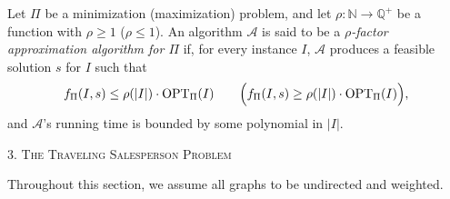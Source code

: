 \documentclass{article}
\newcommand{\N}{\mathbb{N}}
\newcommand{\Q}{\mathbb{Q}}
\newenvironment{definition}[2][Definition]{\begin{trivlist}
\item[\hskip \labelsep {\bfseries #1}\hskip \labelsep {\hspace{-1ex}\bfseries #2.}]}{\end{trivlist}}
\newenvironment{envsection}[1]{\begin{trivlist}
\item[\hskip \labelsep {\bfseries #1}]}{\end{trivlist}}
\begin{document}



\begin{definition}{ (Approximation Algorithm)}{}
    Let $\Pi$ be a minimization (maximization) problem, and let $\rho : \N \to \Q^+$ be a function with $\rho \geq 1$ ($\rho \leq 1$). An algorithm $\mathcal{A}$ is said to be a \textit{$\rho$-factor approximation algorithm for $\Pi$} if, for every instance $I$, $\mathcal{A}$ produces a feasible solution $s$ for $I$ such that
    \[
    f_\Pi(I,s) \leq \rho(|I|) \cdot \text{OPT}_\Pi(I) \qquad \Bigl( f_\Pi(I,s) \geq \rho(|I|) \cdot \text{OPT}_\Pi(I) \Bigr),
    \]
    and $\mathcal{A}$'s running time is bounded by some polynomial in $|I|$.
\end{definition}

\begin{center}
    \textsc{3. The Traveling Salesperson Problem}
\end{center}

\begin{envsection}{Note.}
    Throughout this section, we assume all graphs to be undirected and weighted.
\end{envsection}
\end{document}
